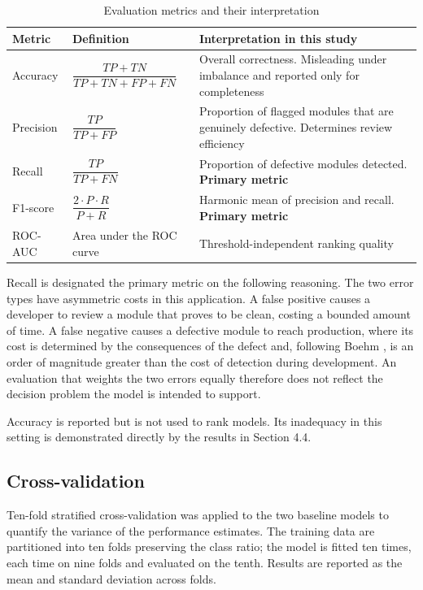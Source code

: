 \documentclass[12pt,a4paper,oneside]{report}
\newcommand{\tabfont}{\fontsize{11}{13}\selectfont\setlength{\tabcolsep}{4pt}}
\begin{document}
\begin{table}[H]
\centering
\caption{Evaluation metrics and their interpretation}
\label{tab:metrics}
\tabfont
\begin{tabular}{L{25mm}L{38mm}L{68mm}}
\toprule
\textbf{Metric} & \textbf{Definition} & \textbf{Interpretation in this study} \\
\midrule
Accuracy  & $\dfrac{TP+TN}{TP+TN+FP+FN}$ & Overall correctness. Misleading under imbalance and reported only for completeness \\[8pt]
Precision & $\dfrac{TP}{TP+FP}$ & Proportion of flagged modules that are genuinely defective. Determines review efficiency \\[8pt]
Recall    & $\dfrac{TP}{TP+FN}$ & Proportion of defective modules detected. \textbf{Primary metric} \\[8pt]
F1-score  & $\dfrac{2 \cdot P \cdot R}{P+R}$ & Harmonic mean of precision and recall. \textbf{Primary metric} \\[8pt]
ROC-AUC   & Area under the ROC curve & Threshold-independent ranking quality \\
\bottomrule
\end{tabular}
\end{table}

Recall is designated the primary metric on the following reasoning. The two error types have asymmetric costs in this application. A false positive causes a developer to review a module that proves to be clean, costing a bounded amount of time. A false negative causes a defective module to reach production, where its cost is determined by the consequences of the defect and, following Boehm \cite{boehm1981}, is an order of magnitude greater than the cost of detection during development. An evaluation that weights the two errors equally therefore does not reflect the decision problem the model is intended to support.

Accuracy is reported but is not used to rank models. Its inadequacy in this setting is demonstrated directly by the results in Section 4.4.

\subsection{Cross-validation}

Ten-fold stratified cross-validation was applied to the two baseline models to quantify the variance of the performance estimates. The training data are partitioned into ten folds preserving the class ratio; the model is fitted ten times, each time on nine folds and evaluated on the tenth. Results are reported as the mean and standard deviation across folds.
\end{document}

